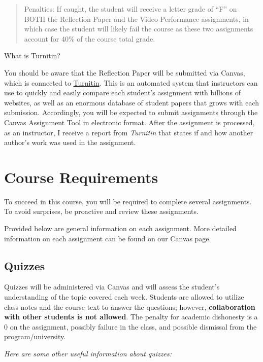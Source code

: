 \documentclass[11pt,]{article}
\begin{document}
\begin{quote}
Penalties: If caught, the student will receive a letter grade of ``F''
on BOTH the Reflection Paper and the Video Performance assignments, in
which case the student will likely fail the course as these two
assignments account for 40\% of the course total grade.
\end{quote}

What is Turnitin?

You should be aware that the Reflection Paper will be submitted via
Canvas, which is connected to
\href{https://www.turnitin.com/}{Turnitin}. This is an automated system
that instructors can use to quickly and easily compare each student's
assignment with billions of websites, as well as an enormous database of
student papers that grows with each submission. Accordingly, you will be
expected to submit assignments through the Canvas Assignment Tool in
electronic format. After the assignment is processed, as an instructor,
I receive a report from \emph{Turnitin} that states if and how another
author's work was used in the assignment.

\hypertarget{course-requirements}{%
\section{Course Requirements}\label{course-requirements}}

To succeed in this course, you will be required to complete several
assignments. To avoid surprises, be proactive and review these
assignments.

Provided below are general information on each assignment. More detailed
information on each assignment can be found on our Canvas page.

\hypertarget{quizzes}{%
\subsection{Quizzes}\label{quizzes}}

Quizzes will be administered via Canvas and will assess the student's
understanding of the topic covered each week. Students are allowed to
utilize class notes and the course text to answer the questions;
however, \textbf{collaboration with other students is not allowed}. The
penalty for academic dishonesty is a 0 on the assignment, possibly
failure in the class, and possible dismissal from the
program/university.

\emph{Here are some other useful information about quizzes:}
\end{document}
